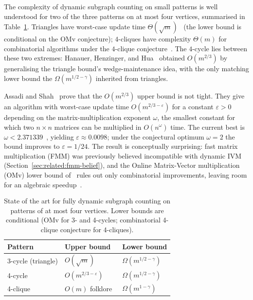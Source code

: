 \documentclass[sigconf,nonacm]{acmart}
\theoremstyle{plain}
\theoremstyle{definition}
\begin{document}
The complexity of dynamic subgraph counting on small patterns is
well understood for two of the three patterns on at most four
vertices, summarised in Table~\ref{tab:ladder}. Triangles have
worst-case update time $\Theta(\sqrt{m})$~\cite{KNN20,HKNS15}
(the lower bound is conditional on the OMv conjecture);
$4$-cliques have complexity $\Theta(m)$ for combinatorial
algorithms under the $4$-clique
conjecture~\cite{HHH22}. The $4$-cycle lies between these two
extremes: Hanauer, Henzinger, and Hua~\cite{HHH22} obtained
$O(m^{2/3})$ by generalising the triangle bound's
wedge-maintenance idea, with the only matching lower bound the
$\Omega(m^{1/2-\gamma})$ inherited from triangles.

Assadi and Shah~\cite{AssadiShah25} prove that the $O(m^{2/3})$
upper bound is not tight. They give an algorithm with worst-case
update time $O(m^{2/3-\varepsilon})$ for a constant $\varepsilon >
0$ depending on the matrix-multiplication exponent $\omega$, the
smallest constant for which two $n \times n$ matrices can be
multiplied in $O(n^\omega)$ time. The current best is
$\omega < 2.371339$~\cite{ADW25}, yielding $\varepsilon \approx
0.0098$; under the conjectural optimum $\omega = 2$ the bound
improves to $\varepsilon = 1/24$. The result is conceptually surprising: fast
matrix multiplication (FMM) was previously believed incompatible
with dynamic IVM (Section~\ref{sec:related:fmm-belief}), and the
Online Matrix-Vector multiplication (OMv) lower bound
of~\cite{HKNS15} rules out only combinatorial improvements, leaving
room for an algebraic speedup~\cite[\S1]{AssadiShah25}.


\begin{table}[H]
  \centering
  \begin{tabular}{lll}
    \toprule
    Pattern & Upper bound & Lower bound \\
    \midrule
    3-cycle (triangle) & $O(\sqrt{m})$~\cite{KNN20} & $\Omega(m^{1/2-\gamma})$~\cite{HKNS15} \\
    4-cycle & $O(m^{2/3-\varepsilon})$~\cite{AssadiShah25} & $\Omega(m^{1/2-\gamma})$~\cite{HKNS15} \\
    4-clique & $O(m)$ folklore~\cite{HHH22} & $\Omega(m^{1-\gamma})$~\cite{HHH22} \\
    \bottomrule
  \end{tabular}
  \caption{State of the art for fully dynamic subgraph counting on patterns of at most four vertices. Lower bounds are conditional (OMv for 3- and 4-cycles; combinatorial 4-clique conjecture for 4-cliques).}
  \label{tab:ladder}
\end{table}
\end{document}
